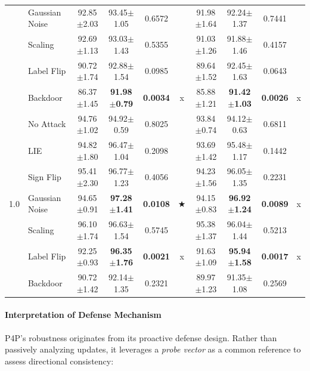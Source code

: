 \begin{table}[t]
{\begin{tabular}{c|l|cc|c|c||cc|c|c}
& Gaussian Noise & 92.85$\pm$2.03 & 93.45$\pm$1.05 & 0.6572 &  & 91.98$\pm$1.64 & 92.24$\pm$1.37 & 0.7441 &  \\
& Scaling & 92.69$\pm$1.13 & 93.03$\pm$1.43 & 0.5355 &  & 91.03$\pm$1.26 & 91.88$\pm$1.46 & 0.4157 &  \\
& Label Flip & 90.72$\pm$1.74 & 92.88$\pm$1.54 & 0.0985 &  & 89.64$\pm$1.52 & 92.45$\pm$1.63 & 0.0643 &  \\
& Backdoor & 86.37$\pm$1.45 & \textbf{91.98$\pm$0.79} & \textbf{0.0034} & x & 85.88$\pm$1.21 & \textbf{91.42$\pm$1.03} & \textbf{0.0026} & x \\
\midrule
\multirow{7}{*}{1.0} 
& No Attack & 94.76$\pm$1.02 & 94.92$\pm$0.59 & 0.8025 &  & 93.84$\pm$0.74 & 94.12$\pm$0.63 & 0.6811 &  \\
& LIE & 94.82$\pm$1.80 & 96.47$\pm$1.04 & 0.2098 &  & 93.69$\pm$1.42 & 95.48$\pm$1.17 & 0.1442 &  \\
& Sign Flip & 95.41$\pm$2.30 & 96.77$\pm$1.23 & 0.4056 &  & 94.23$\pm$1.56 & 96.05$\pm$1.35 & 0.2231 &  \\
& Gaussian Noise & 94.65$\pm$0.91 & \textbf{97.28$\pm$1.41} & \textbf{0.0108} & ★ & 94.15$\pm$0.83 & \textbf{96.92$\pm$1.24} & \textbf{0.0089} & x \\
& Scaling & 96.10$\pm$1.74 & 96.63$\pm$1.54 & 0.5745 &  & 95.38$\pm$1.37 & 96.04$\pm$1.44 & 0.5213 &  \\
& Label Flip & 92.25$\pm$0.93 & \textbf{96.35$\pm$1.76} & \textbf{0.0021} & x & 91.63$\pm$1.09 & \textbf{95.94$\pm$1.58} & \textbf{0.0017} & x \\
& Backdoor & 90.72$\pm$1.42 & 92.14$\pm$1.35 & 0.2321 &  & 89.97$\pm$1.23 & 91.35$\pm$1.08 & 0.2569 &  \\
\bottomrule
\end{tabular}
}
\end{table}

\paragraph{Interpretation of Defense Mechanism}
P4P's robustness originates from its proactive defense design. Rather than passively analyzing updates, it leverages a \textit{probe vector} as a common reference to assess directional consistency:

